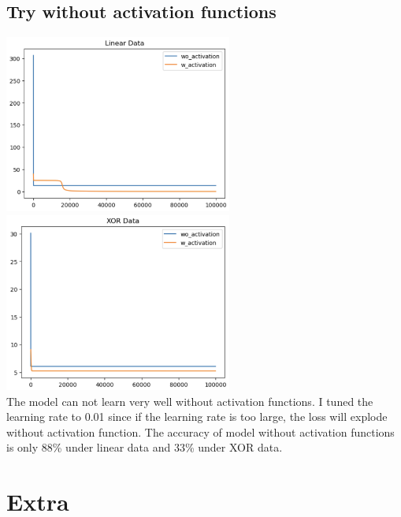\documentclass{article} %
\begin{document}
    \subsection{Try without activation functions}
    \includegraphics[width=7.5cm]{./imgs/wo_act_loss.png}
    \includegraphics[width=7.5cm]{./imgs/xor_wo_act.png} \\
    The model can not learn very well without activation functions. I tuned the learning rate to 0.01 since if the learning rate is too large, the loss will explode without activation function.
    The accuracy of model without activation functions is only 88\% under linear data and 33\% under XOR data.

    \section{Extra}
\end{document}
